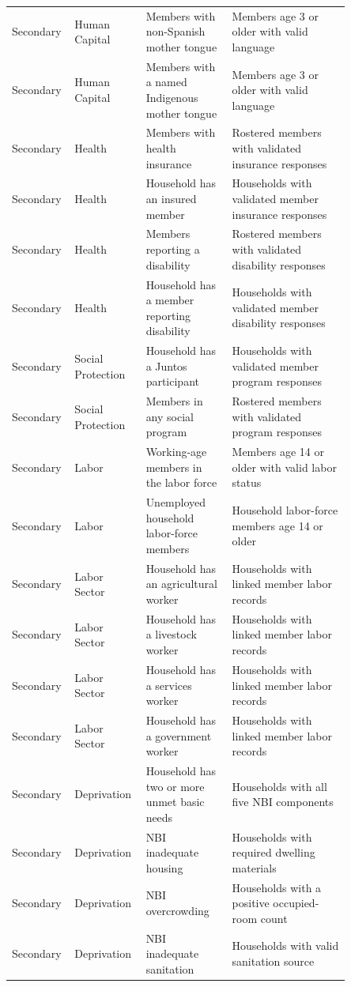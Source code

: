 \begin{longtable}{p{0.10\linewidth}p{0.18\linewidth}p{0.24\linewidth}p{0.33\linewidth}}
Secondary & Human Capital & Members with non-Spanish mother tongue & Members age 3 or older with valid language \\
Secondary & Human Capital & Members with a named Indigenous mother tongue & Members age 3 or older with valid language \\
Secondary & Health & Members with health insurance & Rostered members with validated insurance responses \\
Secondary & Health & Household has an insured member & Households with validated member insurance responses \\
Secondary & Health & Members reporting a disability & Rostered members with validated disability responses \\
Secondary & Health & Household has a member reporting disability & Households with validated member disability responses \\
Secondary & Social Protection & Household has a Juntos participant & Households with validated member program responses \\
Secondary & Social Protection & Members in any social program & Rostered members with validated program responses \\
Secondary & Labor & Working-age members in the labor force & Members age 14 or older with valid labor status \\
Secondary & Labor & Unemployed household labor-force members & Household labor-force members age 14 or older \\
Secondary & Labor Sector & Household has an agricultural worker & Households with linked member labor records \\
Secondary & Labor Sector & Household has a livestock worker & Households with linked member labor records \\
Secondary & Labor Sector & Household has a services worker & Households with linked member labor records \\
Secondary & Labor Sector & Household has a government worker & Households with linked member labor records \\
Secondary & Deprivation & Household has two or more unmet basic needs & Households with all five NBI components \\
Secondary & Deprivation & NBI inadequate housing & Households with required dwelling materials \\
Secondary & Deprivation & NBI overcrowding & Households with a positive occupied-room count \\
Secondary & Deprivation & NBI inadequate sanitation & Households with valid sanitation source \\

\end{longtable}

